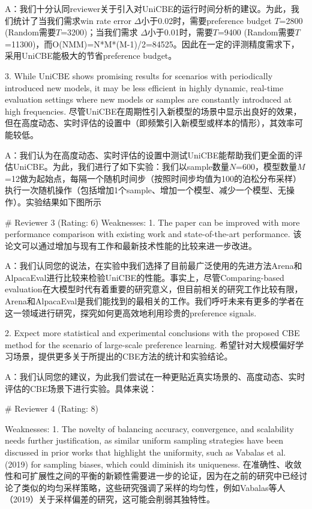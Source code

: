 A：我们十分认同reviewer关于引入对UniCBE的运行时间分析的建议。为此，我们统计了当我们需求win rate error $\Delta$小于0.02时，需要preference budget $T$=2800 (Random需要$T$=3200)；当我们需求 $\Delta$小于0.01时，需要$T$=9400 (Random需要$T$=11300)，而O(NMM)=N*M*(M-1)/2=84525。因此在一定的评测精度需求下，采用UniCBE能极大的节省preference budget。

3. While UniCBE shows promising results for scenarios with periodically introduced new models, it may be less efficient in highly dynamic, real-time evaluation settings where new models or samples are constantly introduced at high frequencies.
尽管UniCBE在周期性引入新模型的场景中显示出良好的效果，但在高度动态、实时评估的设置中（即频繁引入新模型或样本的情形），其效率可能较低。

A：我们认为在高度动态、实时评估的设置中测试UniCBE能帮助我们更全面的评估UniCBE。为此，我们进行了如下实验：我们以sample数量$N$=600，模型数量$M$=12做为起始点，每隔一个随机时间步（按照时间步均值为100的泊松分布采样）执行一次随机操作（包括增加1个sample、增加一个模型、减少一个模型、无操作）。实验结果如下图所示





# Reviewer 3 (Rating: 6)
Weaknesses:
1. The paper can be improved with more performance comparison with existing work and state-of-the-art performance.
该论文可以通过增加与现有工作和最新技术性能的比较来进一步改进。

A：我们认同您的说法，在实验中我们选择了目前最广泛使用的先进方法Arena和AlpacaEval进行比较来检验UniCBE的性能。事实上，尽管Comparing-based evaluation在大模型时代有着重要的研究意义，但目前相关的研究工作比较有限，Arena和AlpacaEval是我们能找到的最相关的工作。我们呼吁未来有更多的学者在这一领域进行研究，探究如何更高效地利用珍贵的preference signals.



2. Expect more statistical and experimental conclusions with the proposed CBE method for the scenario of large-scale preference learning.
希望针对大规模偏好学习场景，提供更多关于所提出的CBE方法的统计和实验结论。

A：我们认同您的建议，为此我们尝试在一种更贴近真实场景的、高度动态、实时评估的CBE场景下进行实验。具体来说：


# Reviewer 4 (Rating: 8)

Weaknesses:
1. The novelty of balancing accuracy, convergence, and scalability needs further justification, as similar uniform sampling strategies have been discussed in prior works that highlight the uniformity, such as Vabalas et al. (2019) for sampling biases, which could diminish its uniqueness.
在准确性、收敛性和可扩展性之间的平衡的新颖性需要进一步的论证，因为在之前的研究中已经讨论了类似的均匀采样策略，这些研究强调了采样的均匀性，例如Vabalas等人（2019）关于采样偏差的研究，这可能会削弱其独特性。

